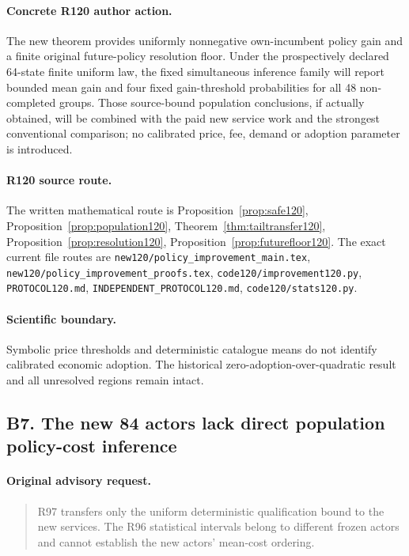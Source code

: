 \paragraph{Concrete R120 author action.}
The new theorem provides uniformly nonnegative own-incumbent policy gain and a finite original future-policy resolution floor. Under the prospectively declared 64-state finite uniform law, the fixed simultaneous inference family will report bounded mean gain and four fixed gain-threshold probabilities for all 48 non-completed groups. Those source-bound population conclusions, if actually obtained, will be combined with the paid new service work and the strongest conventional comparison; no calibrated price, fee, demand or adoption parameter is introduced.
\paragraph{R120 source route.}
The written mathematical route is Proposition~\ref{prop:safe120}, Proposition~\ref{prop:population120}, Theorem~\ref{thm:tailtransfer120}, Proposition~\ref{prop:resolution120}, Proposition~\ref{prop:futurefloor120}. The exact current file routes are \nolinkurl{new120/policy_improvement_main.tex}, \nolinkurl{new120/policy_improvement_proofs.tex}, \nolinkurl{code120/improvement120.py}, \nolinkurl{PROTOCOL120.md}, \nolinkurl{INDEPENDENT_PROTOCOL120.md}, \nolinkurl{code120/stats120.py}.
\paragraph{Scientific boundary.}
Symbolic price thresholds and deterministic catalogue means do not identify calibrated economic adoption. The historical zero-adoption-over-quadratic result and all unresolved regions remain intact.

\subsection{B7. The new 84 actors lack direct population policy-cost inference}
\label{response120:B7}
\paragraph{Original advisory request.}
\begin{quote}
R97 transfers only the uniform deterministic qualification bound to the new services. The R96 statistical intervals belong to different frozen actors and cannot establish the new actors' mean-cost ordering.
\end{quote}
